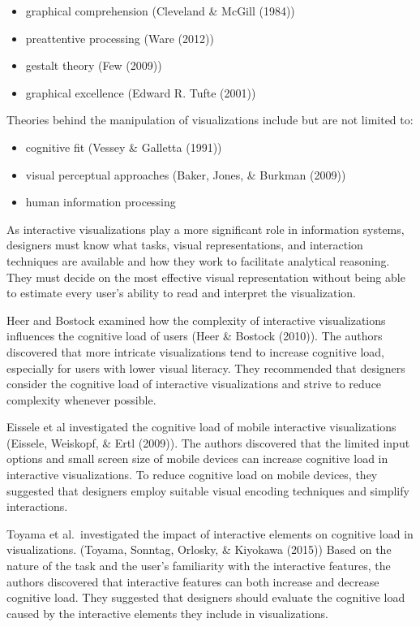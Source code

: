 \documentclass[print]{nuthesis}
\providecommand{\tightlist}{%
  \setlength{\itemsep}{0pt}\setlength{\parskip}{0pt}}
\begin{document}
\begin{itemize}
\tightlist
\item
  graphical comprehension (Cleveland \& McGill (1984))
\item
  preattentive processing (Ware (2012))
\item
  gestalt theory (Few (2009))
\item
  graphical excellence (Edward R. Tufte (2001))
\end{itemize}

Theories behind the manipulation of visualizations include but are not limited to:

\begin{itemize}
\tightlist
\item
  cognitive fit (Vessey \& Galletta (1991))
\item
  visual perceptual approaches (Baker, Jones, \& Burkman (2009))
\item
  human information processing
\end{itemize}

As interactive visualizations play a more significant role in information systems, designers must know what tasks, visual representations, and interaction techniques are available and how they work to facilitate analytical reasoning.
They must decide on the most effective visual representation without being able to estimate every user's ability to read and interpret the visualization.

Heer and Bostock examined how the complexity of interactive visualizations influences the cognitive load of users (Heer \& Bostock (2010)).
The authors discovered that more intricate visualizations tend to increase cognitive load, especially for users with lower visual literacy.
They recommended that designers consider the cognitive load of interactive visualizations and strive to reduce complexity whenever possible.

Eissele et al investigated the cognitive load of mobile interactive visualizations (Eissele, Weiskopf, \& Ertl (2009)).
The authors discovered that the limited input options and small screen size of mobile devices can increase cognitive load in interactive visualizations.
To reduce cognitive load on mobile devices, they suggested that designers employ suitable visual encoding techniques and simplify interactions.

Toyama et al.~investigated the impact of interactive elements on cognitive load in visualizations. (Toyama, Sonntag, Orlosky, \& Kiyokawa (2015))
Based on the nature of the task and the user's familiarity with the interactive features, the authors discovered that interactive features can both increase and decrease cognitive load.
They suggested that designers should evaluate the cognitive load caused by the interactive elements they include in visualizations.
\end{document}
